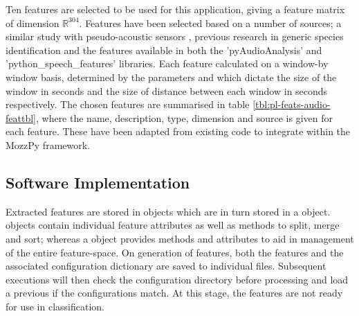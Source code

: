         Ten features are selected to be used for this application, giving a feature matrix of dimension $\mathbb{R}^{304}$. Features have been selected based on a number of sources; a similar study with pseudo-acoustic sensors \cite{Silva2013}, previous research in generic species identification \cite{Zilli2016} and the features available in both the 'pyAudioAnalysis' \cite{Giannakopoulos2015} and 'python\_speech\_features' \cite{Lyons} libraries. Each feature calculated on a window-by window basis, determined by the parameters  and  which dictate the size of the window in seconds and the size of distance between each window in seconds respectively. 
        The chosen features are summarised in table \ref{tbl:pl-feats-audio-feattbl}, where the name, description, type, dimension and source is given for each feature. These have been adapted from existing code to integrate within the MozzPy framework.
        
    \subsection{Software Implementation}
    \label{subsec:pl-feats-software}
        Extracted features are stored in  objects which are in turn stored in a  object.  objects contain individual feature attributes as well as methods to split, merge and sort; whereas a  object provides methods and attributes to aid in management of the entire feature-space. On generation of features, both the features and the associated configuration dictionary are saved to individual files. Subsequent executions will then check the configuration directory before processing and load a previous  if the configurations match. At this stage, the features are not ready for use in classification.  
        
  